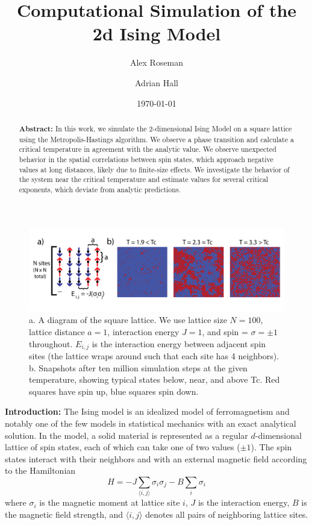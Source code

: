 \documentclass[letter,scriptaddress,twocolumn, prl,nofootinbib]{revtex4}
\begin{document}
\title{Computational Simulation of the 2d Ising Model}

\author{Alex Roseman}
\author{Adrian Hall}
\date{\today}

\begin{abstract}
\textbf{Abstract:} In this work, we simulate the 2-dimensional Ising Model on a square lattice using the Metropolis-Hastings algorithm. We observe a phase transition and calculate a critical temperature in agreement with the analytic value. We observe unexpected behavior in the spatial correlations between spin states, which approach negative values at long distances, likely due to finite-size effects. We investigate the behavior of the system near the critical temperature and estimate values for several critical exponents, which deviate from analytic predictions.
\end{abstract}

\maketitle

\begin{figure}[t]
	\begin{center}
		\includegraphics[width=1\textwidth]{figs/fig1.png}
		\caption{a. A diagram of the square lattice. We use lattice size $N = 100$, lattice distance $a = 1$, interaction energy $J = 1$, and spin = $\sigma = \pm 1$ throughout. $E_{i, j}$ is the interaction energy between adjacent spin sites (the lattice wraps around such that each site has 4 neighbors). b. Snapshots after ten million simulation steps at the given temperature, showing typical states below, near, and above Tc. Red squares have spin up, blue squares spin down.}
		\label{fig:fig1}
	\end{center}
\end{figure}

\textbf{Introduction:} The Ising model is an idealized model of ferromagnetism and notably one of the few models in statistical mechanics with an exact analytical solution. In the model, a solid material is represented as a regular $d$-dimensional lattice of spin states, each of which can take one of two values ($\pm 1$). The spin states interact with their neighbors and with an external magnetic field according to the Hamiltonian
\begin{equation}
	\label{eq:hamiltonian}
	H = -J \sum_{\langle i, j \rangle} \sigma_i \sigma_j - B \sum_i \sigma_i
\end{equation}
where $\sigma_i$ is the magnetic moment at lattice site $i$, $J$ is the interaction energy, $B$ is the magnetic field strength, and $\langle i, j \rangle$ denotes all pairs of neighboring lattice sites.
\end{document}
